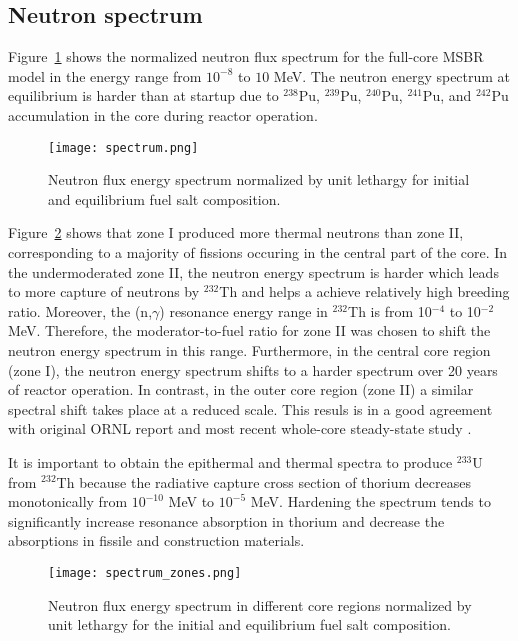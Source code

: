 \subsection{Neutron spectrum}
Figure~\ref{fig:spectrum} shows the normalized neutron flux spectrum for the full-core \gls{MSBR} model in the energy range from $10^{-8}$ to $10$ MeV. The neutron energy spectrum at equilibrium is harder than at startup due to $^{238}$Pu, $^{239}$Pu, $^{240}$Pu, $^{241}$Pu, and $^{242}$Pu accumulation in the core during reactor operation. 
\begin{figure}[ht!] %
  \centering
  \texttt{[image: spectrum.png]} 
  \caption{Neutron flux energy spectrum normalized by unit lethargy for initial and equilibrium fuel salt composition.}
  \label{fig:spectrum}
\end{figure}
Figure~\ref{fig:spectrum_zones} shows that zone I produced more thermal neutrons than zone II, corresponding to a majority of fissions occuring in the central part of the core. In the undermoderated zone II, the neutron energy spectrum is harder which leads to more capture of neutrons by $^{232}$Th and helps a achieve relatively high breeding ratio. Moreover, the (n,$\gamma$) resonance energy range in $^{232}$Th is from 10$^{-4}$ to 10$^{-2}$ MeV. Therefore, the moderator-to-fuel ratio for zone II was chosen to shift the neutron energy spectrum in this range. Furthermore, in the central core region (zone I), the neutron energy spectrum shifts to a harder spectrum over 20 years of reactor operation. In contrast, in the outer core region (zone II) a similar spectral shift takes place at a reduced scale. This resuls is in a good agreement with original ORNL report \cite{robertson_conceptual_1971} and most recent whole-core steady-state study \cite{park_whole_2015}.

It is important to obtain the epithermal and thermal spectra to produce $^{233}$U from $^{232}$Th because the radiative capture cross section of thorium decreases monotonically from $10^{-10}$ MeV to $10^{-5}$ MeV. Hardening the spectrum tends to significantly increase resonance absorption in thorium and decrease the absorptions in fissile and construction materials. 
\begin{figure}[ht!] %
  \centering
  \texttt{[image: spectrum\_zones.png]} 
  \caption{Neutron flux energy spectrum in different core regions normalized by unit lethargy for the initial and equilibrium fuel salt composition.}
  \label{fig:spectrum_zones}
\end{figure}

